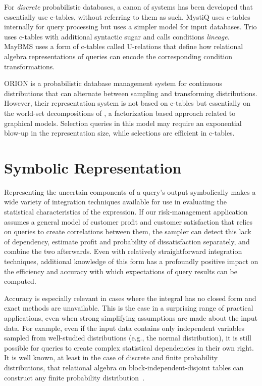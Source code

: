For {\em discrete} probabilistic  databases, a canon of systems has been developed that essentially use c-tables, without referring to them as such. MystiQ  \cite{dalvi07efficient}  uses  c-tables internally  for  query processing  but  uses  a  simpler  model for  input  databases.   Trio \cite{WidomTrio2008}  uses  c-tables with  additional  syntactic sugar  and calls conditions {\em lineage}\/.  MayBMS \cite{AJKO2008}  uses a  form of  c-tables called  U-relations that define how relational algebra representations of queries can encode the corresponding condition transformations.

ORION \cite{ORION} is a probabilistic database management system for
continuous distributions that can alternate between sampling
and transforming distributions. However, their representation
system is not based on c-tables but essentially on the
world-set decompositions of \cite{AKO07WSD}, a factorization
based approach related to graphical models.
Selection queries in this model may require an exponential blow-up in the
representation size, while selections are efficient in c-tables.




\section{Symbolic Representation}

Representing the uncertain components of a query's output symbolically makes a wide variety of integration techniques available for use in evaluating the statistical characteristics of the expression.  If our risk-management application assumes a general model of customer profit and customer satisfaction that relies on queries to create correlations between them, the sampler can detect this lack of dependency, estimate profit and probability of dissatisfaction separately, and combine the two afterwards.  Even with relatively straightforward integration techniques, additional knowledge of this form has a profoundly positive impact on the efficiency and accuracy with which expectations of query results can be computed.

Accuracy is especially relevant in cases where the integral has no closed form and exact methods are unavailable.  This is the case in a surprising range of practical applications, even when strong simplifying assumptions are made about the input data.  For example, even if the input data contains only independent variables sampled from well-studied distributions (e.g., the normal distribution), it is still possible for queries to create complex statistical dependencies in their own right.  It is well known, at least in the case of discrete and finite probability distributions, that relational algebra on block-independent-disjoint tables can construct any finite probability distribution\ \cite{1325861,IL1984}.

